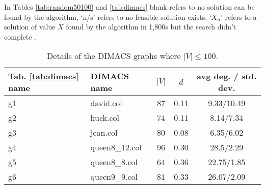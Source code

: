 \documentclass[10pt]{article}
\begin{document}
In Tables \ref{tab:random50100} and \ref{tab:dimacs} blank refers to no solution 
    can be found by the algorithm, `n/s' refers to no feasible solution exists, `$X_n$' refers to a solution of value $X$ found 
   by the algorithm in 1,800s but the search didn't complete .
   \begin{table}
  \small
  \centering
    \caption{Details of the DIMACS \cite{dimacs} graphs where $|V| \leq 100$.}
  \begin{tabular}{|l|l|c|c|c|} \hline
	Tab. \ref{tab:dimacs} name &DIMACS name&$|V|$&$d$&avg deg. / std. dev.\\ 
	\hline
	g1&david.col&87&0.11& 9.33/10.49\\
	\hline
	g2&huck.col&74&0.11& 8.14/7.34\\
	\hline
	g3&jean.col&80&0.08& 6.35/6.02\\
	\hline
	g4&queen8\_12.col&96&0.30& 28.5/2.29\\
	\hline
	g5&queen8\_8.col&64&0.36&22.75/1.85\\
	\hline
	g6&queen9\_9.col&81&0.33&26.07/2.09\\
	\hline
  \end{tabular}
    \label{tab:dimacs_set}
\end{table}
\end{document}
